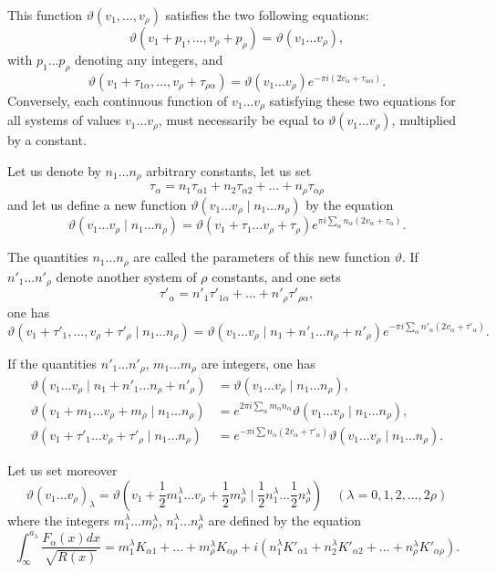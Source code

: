 \documentclass{article}
\begin{document}
This function $\vartheta(v_1, \ldots, v_\rho)$ satisfies the two following equations:
\[
\vartheta(v_1 + p_1, \ldots, v_\rho + p_\rho) = \vartheta(v_1\ldots v_\rho),
\]
with $p_1\ldots p_\rho$ denoting any integers, and
\[
\vartheta(v_1 + \tau_{1\alpha}, \ldots, v_\rho + \tau_{\rho\alpha}) = \vartheta(v_1\ldots v_\rho)e^{-\pi i(2v_\alpha + \tau_{\alpha\alpha})}.
\]
Conversely, each continuous function of $v_1\ldots v_\rho$ satisfying these two equations for all systems of values $v_1\ldots v_\rho$, must necessarily be equal to $\vartheta(v_1\ldots v_\rho)$, multiplied by a constant.

Let us denote by $n_1\ldots n_\rho$ arbitrary constants, let us set
\[
\tau_\alpha = n_1\tau_{\alpha 1} + n_2\tau_{\alpha 2} + \ldots + n_\rho\tau_{\alpha \rho}
\]
and let us define a new function $\vartheta(v_1\ldots v_\rho \mid n_1\ldots n_\rho)$ by the equation
\[
\vartheta(v_1\ldots v_\rho \mid n_1\ldots n_\rho) = \vartheta(v_1 + \tau_1\ldots v_\rho + \tau_\rho)e^{\pi i\sum_\alpha n_\alpha(2v_\alpha + \tau_\alpha)}.
\]

The quantities $n_1\ldots n_\rho$ are called the parameters of this new function $\vartheta$. If $n'_1\ldots n'_\rho$ denote another system of $\rho$ constants, and one sets
\[
\tau'_\alpha = n'_1\tau'_{1\alpha} + \ldots + n'_\rho\tau'_{\rho\alpha},
\]
one has
\[
\vartheta(v_1 + \tau'_{1}, \ldots, v_\rho + \tau'_{\rho}\mid n_1\ldots n_\rho) = \vartheta(v_1\ldots v_\rho \mid n_1 + n'_1\ldots n_\rho + n'_\rho)e^{-\pi i\sum_\alpha n'_\alpha(2v_\alpha + \tau'_\alpha)}.
\]

If the quantities $n'_1\ldots n'_\rho$, $m_1\ldots m_\rho$ are integers, one has
\begin{align*}
\vartheta(v_1\ldots v_\rho \mid n_1 + n'_1\ldots n_\rho + n'_\rho) &= \vartheta(v_1\ldots v_\rho \mid n_1\ldots n_\rho), \\
\vartheta(v_1 + m_1\ldots v_\rho + m_\rho \mid n_1\ldots n_\rho) &= e^{2\pi i\sum_{\alpha} m_\alpha n_\alpha}\vartheta(v_1\ldots v_\rho \mid n_1\ldots n_\rho), \\
\vartheta(v_1 + \tau'_1\ldots v_\rho + \tau'_\rho \mid n_1\ldots n_\rho) &= e^{-\pi i\sum n_\alpha(2v_\alpha + \tau'_\alpha)}\vartheta(v_1\ldots v_\rho \mid n_1\ldots n_\rho).
\end{align*}

Let us set moreover
\[
\vartheta(v_1\ldots v_\rho)_\lambda = \vartheta\left(v_1 + \frac{1}{2}m^{\lambda}_{1}\ldots v_\rho + \frac{1}{2}m^{\lambda}_{\rho} \mid \frac{1}{2}n^{\lambda}_{1}\ldots\frac{1}{2}n^{\lambda}_{\rho}\right) \quad (\lambda = 0, 1, 2, \ldots, 2\rho)
\]
where the integers $m^{\lambda}_{1}\ldots m^{\lambda}_{\rho}$, $n^{\lambda}_{1}\ldots n^{\lambda}_{\rho}$ are defined by the equation
\[
\int_{\infty}^{a_\lambda} \frac{F_\alpha(x)dx}{\sqrt{R(x)}} = m^{\lambda}_{1}K_{\alpha 1} + \ldots + m^{\lambda}_{\rho}K_{\alpha\rho} + i(n^{\lambda}_{1}K'_{\alpha 1} + n^{\lambda}_{2}K'_{\alpha 2} + \ldots + n^{\lambda}_{\rho}K'_{\alpha\rho}).
\]
\end{document}
